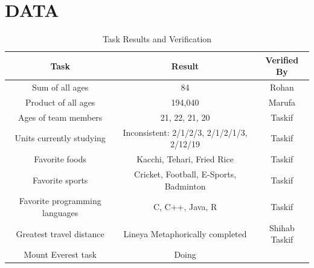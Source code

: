 \chapter{DATA} \label{ch:data}

\begin{table}[h]
\centering
\begin{tabular}{ccc}
\toprule
\textbf{Task} & \textbf{Result} & \textbf{Verified By} \\
\midrule
\myrowcolour%
Sum of all ages & 84 & Rohan \\
Product of all ages & 194,040 & Marufa \\
\myrowcolour%
Ages of team members & 21, 22, 21, 20 & Taskif \\
Units currently studying & Inconsistent: 2/1/2/3, 2/1/2/1/3, 2/12/19 & Taskif \\
\myrowcolour%
Favorite foods & Kacchi, Tehari, Fried Rice & Taskif \\
Favorite sports & Cricket, Football, E-Sports, Badminton & Taskif \\
\myrowcolour%
Favorite programming languages & C, C++, Java, R & Taskif \\
Greatest travel distance & Lineya Metaphorically completed & Shihab Taskif \\
\myrowcolour%
Mount Everest task & Doing & \\
\bottomrule
\end{tabular}
\caption{Task Results and Verification}
\label{tab:task_results}
\end{table}
 


